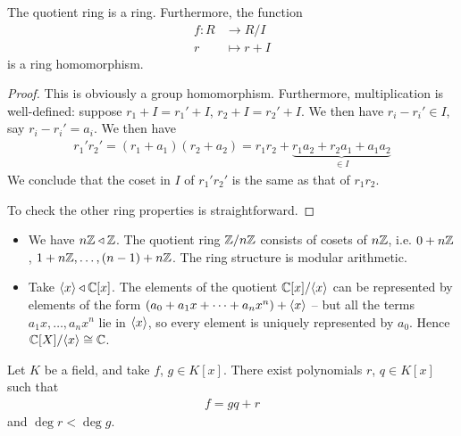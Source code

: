\documentclass{../../template/note}
\begin{document}
    \begin{proposition}
        The quotient ring is a ring. Furthermore, the function
        \begin{align*}
            f: R &\to R/I \\
            r &\mapsto r + I
        \end{align*}
        is a ring homomorphism.
    \end{proposition}
    
    \begin{proof}
        This is obviously a group homomorphism. Furthermore, multiplication is well-defined: suppose $r_1 + I = r_1' + I$, $r_2 + I = r_2' + I$. We then have $r_i - r_i' \in I$, say $r_i - r_i' = a_i$. We then have
        \begin{align*}
            r_1'r_2' = (r_1+a_1)(r_2+a_2) = r_1r_2 + \underbrace{r_1a_2 + r_2a_1 + a_1a_2}_{\in I}
        \end{align*}
        We conclude that the coset in $I$ of $r_1'r_2'$ is the same as that of $r_1r_2$.

        To check the other ring properties is straightforward.        
    \end{proof}
    
    \begin{example}
        \begin{itemize}
            \item We have $n\mathbb Z \triangleleft \mathbb Z$. The quotient ring $\mathbb Z/n\mathbb Z$ consists of cosets of $n\mathbb Z$, i.e. $0 + n\mathbb Z$, $1 + n\mathbb Z, \dots, (n-1) + n\mathbb Z$. The ring structure is modular arithmetic.
            \item Take $\left \langle x \right \rangle \triangleleft \mathbb C[x]$. The elements of the quotient $\mathbb C[x]/\!\left \langle x \right \rangle$ can be represented by elements of the form $(a_0 + a_1x + \dots + a_nx^n) + \left \langle x \right \rangle$ -- but all the terms $a_1x, \dots, a_nx^n$ lie in $\left \langle x \right \rangle$, so every element is uniquely represented by $a_0$. Hence $\mathbb C[X]/\!\left \langle x \right \rangle \cong \mathbb C$.
        \end{itemize}
    \end{example}
    
    \begin{proposition}
        Let $K$ be a field, and take $f$, $g \in K[x]$. There exist polynomials $r$, $q \in K[x]$ such that
        \begin{align*}
            f = gq + r
        \end{align*}
        and $\deg r < \deg g$.        
    \end{proposition}
    
\end{document}
